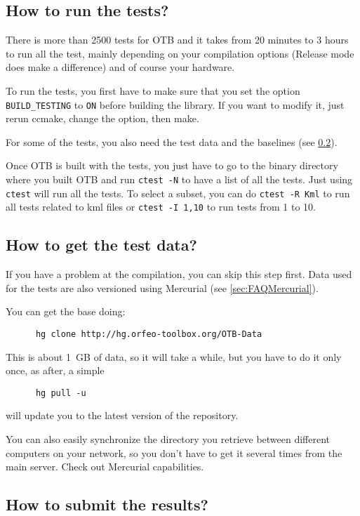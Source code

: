 \subsection{How to run the tests?}

There is more than 2500 tests for OTB and it takes from 20 minutes to 3 hours to run all the test, mainly depending on your compilation options (Release mode does make a difference) and of course your hardware.

To run the tests, you first have to make sure that you set the option \texttt{BUILD\_TESTING} to \texttt{ON} before building the library. If you want to modify it, just rerun ccmake, change the option, then make.

For some of the tests, you also need the test data and the baselines (see \ref{sec:FAQTestData}).

Once OTB is built with the tests, you just have to go to the binary directory where you built OTB and run \texttt{ctest -N} to have a list of all the tests. Just using \texttt{ctest} will run all the tests. To select a subset, you can do \texttt{ctest -R Kml} to run all tests related to kml files or \texttt{ctest -I 1,10} to run tests from 1 to 10.

\subsection{How to get the test data?}\label{sec:FAQTestData}

If you have a problem at the compilation, you can skip this step first.
Data used for the tests are also versioned using Mercurial (see \ref{sec:FAQMercurial}).

You can get the base doing:
\begin{verbatim}
      hg clone http://hg.orfeo-toolbox.org/OTB-Data
\end{verbatim}

This is about 1~GB of data, so it will take a while, but you have to do it only once, as after, a simple
\begin{verbatim}
      hg pull -u
\end{verbatim}
will update you to the latest version of the repository.

You can also easily synchronize the directory you retrieve between different computers on your network, so you don't have to get it several times from the main server. Check out Mercurial capabilities.

\subsection{How to submit the results?}

